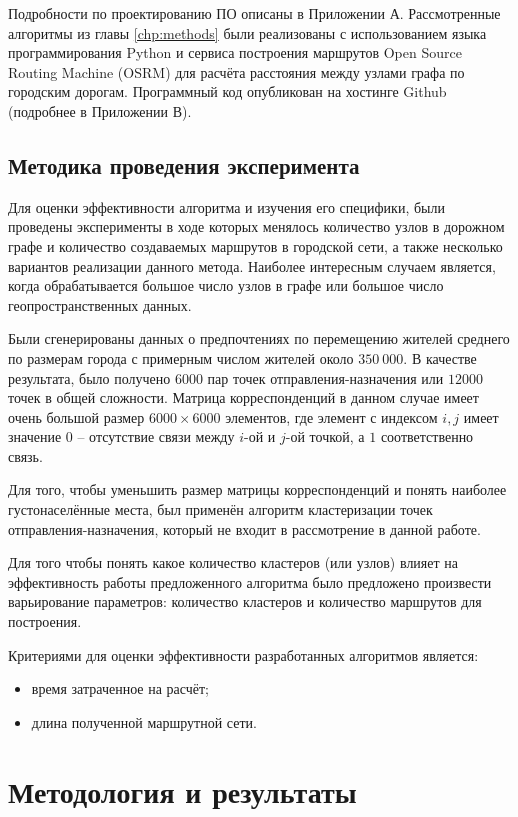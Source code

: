 Подробности по проектированию ПО описаны в Приложении А. Рассмотренные алгоритмы из главы \ref{chp:methods} 
были реализованы с использованием языка программирования Python и сервиса построения маршрутов Open Source 
Routing Machine (OSRM) для расчёта расстояния между узлами графа по городским дорогам. Программный код 
опубликован на хостинге Github (подробнее в Приложении В).

\section{Методика проведения эксперимента}
Для оценки эффективности алгоритма и изучения его специфики, были проведены эксперименты в ходе которых 
менялось количество узлов в дорожном графе и количество создаваемых маршрутов в городской сети, а также 
несколько вариантов реализации данного метода. Наиболее интересным случаем является, когда обрабатывается 
большое число узлов в графе или большое число геопространственных данных.

Были сгенерированы данных о предпочтениях по перемещению жителей среднего по размерам города с примерным 
числом жителей около \( 350\ 000 \). В качестве результата, было получено \( 6000 \) пар точек 
отправления-назначения или \( 12000 \) точек в общей сложности. Матрица корреспонденций в данном случае имеет 
очень большой размер \( 6000 \times 6000 \) элементов, где элемент с индексом \( i, j \) имеет значение 
\( 0 \) -- отсутствие связи между \( i \)-ой и \( j \)-ой точкой, а \( 1 \) соответственно связь.

Для того, чтобы уменьшить размер матрицы корреспонденций и понять наиболее густонаселённые места, был 
применён алгоритм кластеризации точек отправления-назначения, который не входит в рассмотрение в данной 
работе.

Для того чтобы понять какое количество кластеров (или узлов) влияет на эффективность работы предложенного 
алгоритма было предложено произвести варьирование параметров: количество кластеров и количество маршрутов для 
построения.

Критериями для оценки эффективности разработанных алгоритмов является:
\begin{itemize}
    \item время затраченное на расчёт;
    \item длина полученной маршрутной сети.
\end{itemize}

\chapter{Методология и результаты}
